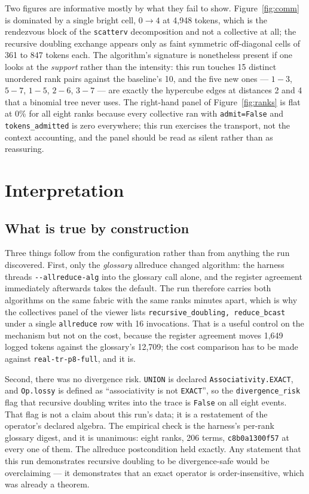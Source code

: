 \documentclass[11pt]{article}
\begin{document}
Two figures are informative mostly by what they fail to show. Figure~\ref{fig:comm} is dominated by
a single bright cell, $0\rightarrow4$ at 4,948 tokens, which is the rendezvous block of the
\texttt{scatterv} decomposition and not a collective at all; the recursive doubling exchange
appears only as faint symmetric off-diagonal cells of 361 to 847 tokens each. The algorithm's
signature is nonetheless present if one looks at the \emph{support} rather than the intensity: this
run touches 15 distinct unordered rank pairs against the baseline's 10, and the five new ones ---
$1\!-\!3$, $5\!-\!7$, $1\!-\!5$, $2\!-\!6$, $3\!-\!7$ --- are exactly the hypercube edges at
distances 2 and 4 that a binomial tree never uses. The right-hand panel of
Figure~\ref{fig:ranks} is flat at 0\% for all eight ranks because every collective ran with
\texttt{admit=False} and \texttt{tokens\_admitted} is zero everywhere; this run exercises the
transport, not the context accounting, and the panel should be read as silent rather than as
reassuring.

\section{Interpretation}

\subsection*{What is true by construction}

Three things follow from the configuration rather than from anything the run discovered. First,
only the \emph{glossary} allreduce changed algorithm: the harness threads
\texttt{-{}-allreduce-alg} into the glossary call alone, and the register agreement immediately
afterwards takes the default. The run therefore carries both algorithms on the same fabric with the
same ranks minutes apart, which is why the collectives panel of the viewer lists
\texttt{recursive\_doubling, reduce\_bcast} under a single \texttt{allreduce} row with 16
invocations. That is a useful control on the mechanism but not on the cost, because the register
agreement moves 1,649 logged tokens against the glossary's 12,709; the cost comparison has to be
made against \texttt{real-tr-p8-full}, and it is.

Second, there was no divergence risk. \texttt{UNION} is declared \texttt{Associativity.EXACT}, and
\texttt{Op.lossy} is defined as ``associativity is not \texttt{EXACT}'', so the
\texttt{divergence\_risk} flag that recursive doubling writes into the trace is \texttt{False} on
all eight events. That flag is not a claim about this run's data; it is a restatement of the
operator's declared algebra. The empirical check is the harness's per-rank glossary digest, and it
is unanimous: eight ranks, 206 terms, \texttt{c8b0a1300f57} at every one of them. The allreduce
postcondition held exactly. Any statement that this run demonstrates recursive doubling to be
divergence-safe would be overclaiming --- it demonstrates that an exact operator is
order-insensitive, which was already a theorem.
\end{document}
